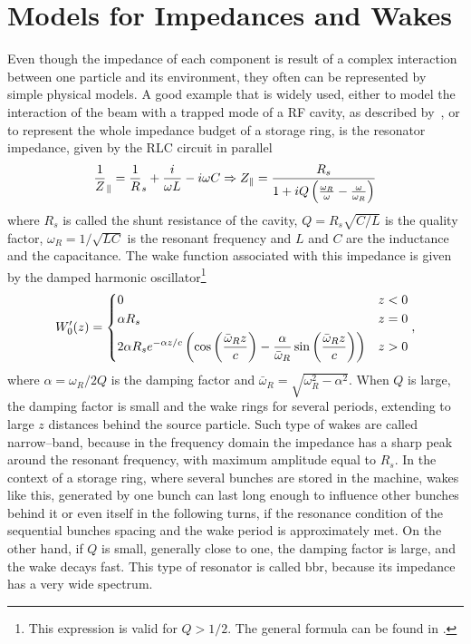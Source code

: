 \section{Models for Impedances and Wakes}

    Even though the impedance of each component is result of a complex interaction between one particle and its environment, they often can be represented by simple physical models. A good example that is widely used, either to model the interaction of the beam with a trapped mode of a RF cavity, as described by~, or to represent the whole impedance budget of a storage ring, is the resonator impedance, given by the RLC circuit in parallel
    \begin{align}\label{eq:long_resonator_impedance}
        \frac1Z_\parallel =  \frac1R_s + \frac{i}{\omega L} - i\omega C \Rightarrow
        Z_\parallel = \frac{R_s}{1 + iQ\left(\frac{\omega_R}{\omega}-\frac{\omega}{\omega_R}\right)}
    \end{align}
    where $R_s$ is called the shunt resistance of the cavity, $Q = R_s\sqrt{C/L}$ is the quality factor, $\omega_R = 1/\sqrt{LC}$ is the resonant frequency and  $L$ and $C$ are the inductance and the capacitance. The wake function associated with this impedance is given by the damped harmonic oscillator\footnote{\label{ftn:resonator} This expression is valid for $Q>1/2$. The general formula can be found in .}
    \begin{align}
        W'_0(z) =
        \begin{dcases}
            0 & z < 0 \\
            \alpha R_s & z = 0 \\
            2\alpha R_se^{-\alpha z/c}\left(\cos\left(\frac{\bar{\omega}_Rz}{c}\right)-
                                    \frac{\alpha}{\bar{\omega}_R}
                                        \sin\left(\frac{\bar{\omega}_Rz}{c}\right)\right) & z>0
        \end{dcases},
    \end{align}
    where $\alpha = \omega_R/2Q$ is the damping factor and $\bar{\omega}_R=\sqrt{\omega_R^2-\alpha^2}$. When $Q$ is large, the damping factor is small and the wake rings for several periods, extending to large $z$ distances behind the source particle. Such type of wakes are called narrow--band, because in the frequency domain the impedance has a sharp peak around the resonant frequency, with maximum amplitude equal to $R_s$. In the context of a storage ring, where several bunches are stored in the machine, wakes like this, generated by one bunch can last long enough to influence other bunches behind it or even itself in the following turns, if the resonance condition of the sequential bunches spacing and the wake period is approximately met. On the other hand, if $Q$ is small, generally close to one, the damping factor is large, and the wake decays fast. This type of resonator is called \gls{bbr}, because its impedance has a very wide spectrum.

